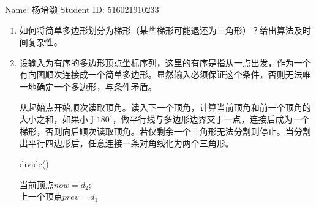\documentclass[12pt,a4paper]{article}
\makeatletter
\newtheorem*{solution}{Solution}
\theoremstyle{definition}
\renewenvironment{solution}[1][Solution] {\par\pushQED{\qed}\normalfont\topsep6\p@\@plus6\p@\relax\trivlist\item[\hskip\labelsep\bfseries#1\@addpunct{.}]\ignorespaces}{\popQED\endtrivlist\@endpefalse} \makeatother
\makeatother
\begin{document}
\noindent

\noindent{}
\begin{center}

\footnotesize{\color{black} Name: 杨培灏  \quad Student ID: 516021910233}
\end{center}

\begin{enumerate}

\item 如何将简单多边形划分为梯形（某些梯形可能退还为三角形）？给出算法及时间复杂性。
\begin{solution}
	设输入为有序的多边形顶点坐标序列，这里的有序是指从一点出发，作为一个有向图顺次连接成一个简单多边形。显然输入必须保证这个条件，否则无法唯一地确定一个多边形，与条件矛盾。
	
	从起始点开始顺次读取顶角。读入下一个顶角，计算当前顶角和前一个顶角的大小之和，如果小于$180^{\circ}$，做平行线与多边形边界交于一点，连接后成为一个梯形，否则向后顺次读取顶角。若仅剩余一个三角形无法分割则停止。当分割出平行四边形后，任意连接一条对角线化为两个三角形。
	\begin{center}
		\begin{algorithm}[H]
			\caption{divide()}
			当前顶点$now=d_2$;\\
			上一个顶点$prev=d_1$
			

\end{algorithm}
\end{center}
\end{solution}
\end{enumerate}
\end{document}
